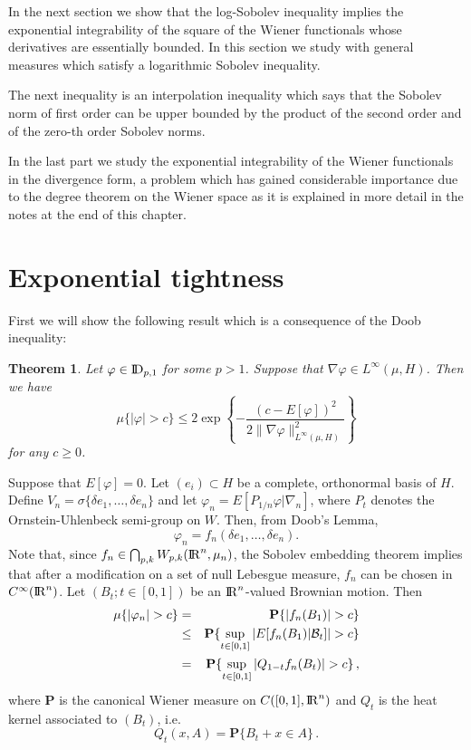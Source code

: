 \documentclass[12pt,a4paper]{book}
\def\P{{\mathbf P}}
\newtheorem{theorem}{Theorem}[section]
\newcommand{\DD}{{\rm I\!D}}
\newcommand{\calB}{{\cal B}}
\newcommand{\R}{{\rm I\!R}}
\newcommand{\proof}{\noindent {\bf Proof:\ }}
\begin{document}
In the next section we show that the log-Sobolev inequality implies
the exponential integrability of the square of the Wiener functionals
whose derivatives are essentially bounded. In this section we study
with general measures which satisfy a logarithmic Sobolev inequality.

The next  inequality is an interpolation inequality which says that the
Sobolev norm of first order can be upper bounded  by the product  of
the  second order and of the  zero-th order Sobolev norms.

In the last part we study the exponential integrability of the Wiener
functionals in the divergence form, a problem which has gained
considerable importance due to the degree theorem on the Wiener space
as it is explained in more detail in the notes at the end of this chapter.

\section{Exponential tightness }
First we will show the following result which is a consequence of the
Doob inequality:
\begin{theorem}
\label{exp-int-thm}
Let $\varphi\in \DD_{p,1}$ for some $p>1$. Suppose that $\nabla\varphi\in
L^\infty(\mu,H)$. Then we have
$$
\mu\{|\varphi|>c\}\leq2\exp\left\{-
\frac{(c-E[\varphi])^2}{2\|\nabla\varphi\|^2_{L^\infty(\mu,H)}}\right\}
$$
for any $c\geq 0$.
\end{theorem}
\proof
Suppose that $E[\varphi]=0$. Let $(e_i)\subset H$ be a complete, orthonormal
basis of $H$. Define
$V_n=\sigma\{\delta e_1,\ldots,\delta e_n\}$ and let
$\varphi_n=E[P_{1/n}\varphi|\nabla_n]$, where $P_t$ denotes the
Ornstein-Uhlenbeck semi-group on $W$.  Then, from Doob's Lemma,
$$
\varphi_n  =  f_n(\delta e_1,\ldots,\delta e_n).
$$
Note that, since
$f_n\in\bigcap_{p,k}W_{p,k}(\R^n,\mu_n)$, the Sobolev embedding
theorem implies that after a modification on a  set of null Lebesgue
measure, $ f_n$ can be chosen in $C^\infty(\R^n)$. Let
$(B_t;t\in[0,1])$ be an  $\R^n$-valued Brownian motion. Then
\begin{eqnarray*}
\mu\{|\varphi_n|>c\} & = & \P\{|f_n(B_1)|>c\} \\
& \leq & \P\{\sup_{t\in[0,1]}|E[f_n(B_1)|{\calB}_t]|>c\} \\
& = & \P\{\sup_{t\in[0,1]}|Q_{1-t}f_n(B_t)|>c\}\,,
\end{eqnarray*}
where $\P$ is the canonical Wiener measure on $C([0,1],\R^n)$  and  $Q_t$ is
the heat kernel associated to $(B_t)$, i.e.
$$
Q_t(x,A)=\P\{B_t+x\in A\}\,.
$$
\end{document}
